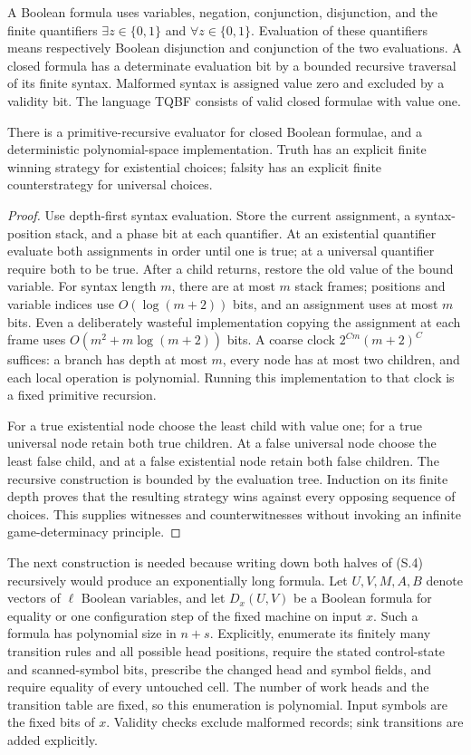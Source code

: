 A Boolean formula uses variables, negation, conjunction, disjunction,
and the finite quantifiers $\exists z\in\{0,1\}$ and
$\forall z\in\{0,1\}$.  Evaluation of these quantifiers means respectively
Boolean disjunction and conjunction of the two evaluations.  A closed
formula has a determinate evaluation bit by a bounded recursive traversal
of its finite syntax.  Malformed syntax is assigned value zero and
excluded by a validity bit.  The language TQBF consists of valid closed
formulae with value one.

\begin{theorem}
\label{thm:S10}
There is a primitive-recursive evaluator for closed Boolean formulae,
and a deterministic polynomial-space implementation.  Truth has an
explicit finite winning strategy for existential choices; falsity has
an explicit finite counterstrategy for universal choices.
\end{theorem}
\begin{proof}
Use depth-first syntax evaluation.  Store the current assignment,
a syntax-position stack, and a phase bit at each quantifier.  At an
existential quantifier evaluate both assignments in order until one
is true; at a universal quantifier require both to be true.  After a
child returns, restore the old value of the bound variable.  For syntax
length $m$, there are at most $m$ stack frames; positions and variable
indices use $O(\log(m+2))$ bits, and an assignment uses at most $m$
bits.  Even a deliberately wasteful implementation copying the assignment
at each frame uses $O(m^2+m\log(m+2))$ bits.  A coarse clock
$2^{Cm}(m+2)^C$ suffices: a branch has depth at most $m$, every node
has at most two children, and each local operation is polynomial.
Running this implementation to that clock is a fixed primitive recursion.

For a true existential node choose the least child with value one;
for a true universal node retain both true children.  At a false
universal node choose the least false child, and at a false existential
node retain both false children.  The recursive construction is bounded
by the evaluation tree.  Induction on its finite depth proves that the
resulting strategy wins against every opposing sequence of choices.
This supplies witnesses and counterwitnesses without invoking an
infinite game-determinacy principle.
\end{proof}

The next construction is needed because writing down both halves of
(S.4) recursively would produce an exponentially long formula.
Let $U,V,M,A,B$ denote vectors of $\ell$ Boolean variables, and let
$D_x(U,V)$ be a Boolean formula for equality or one configuration step
of the fixed machine on input $x$.  Such a formula has polynomial size
in $n+s$.  Explicitly, enumerate its finitely many transition rules
and all possible head positions, require the stated control-state and
scanned-symbol bits, prescribe the changed head and symbol fields,
and require equality of every untouched cell.  The number of work
heads and the transition table are fixed, so this enumeration is
polynomial.  Input symbols are the fixed bits of $x$.  Validity checks
exclude malformed records; sink transitions are added explicitly.

